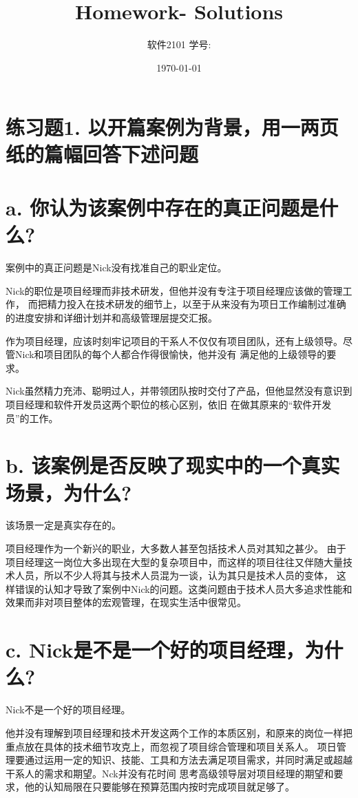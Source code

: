 \documentclass[11pt]{article}  %
\title{\vspace{-4cm}\CourseCodeName \space
        \Session \protect\\  Homework-\textbf{\Homework} Solutions}
\author{软件2101 \Name \space 学号: \SID}
\date{\today}
\begin{document}
\maketitle

\section*{练习题1. 以开篇案例为背景，用一两页纸的篇幅回答下述问题}

\section*{a. 你认为该案例中存在的真正问题是什么? }

案例中的真正问题是Nick没有找准自己的职业定位。

Nick的职位是项目经理而非技术研发，但他并没有专注于项目经理应该做的管理工作，
而把精力投入在技术研发的细节上，以至于从来没有为项日工作编制过准确的进度安排和详细计划并和高级管理层提交汇报。

作为项目经理，应该时刻牢记项目的干系人不仅仅有项目团队，还有上级领导。尽管Nick和项目团队的每个人都合作得很愉快，他并没有
满足他的上级领导的要求。

Nick虽然精力充沛、聪明过人，并带领团队按时交付了产品，但他显然没有意识到项目经理和软件开发员这两个职位的核心区别，依旧
在做其原来的“软件开发员”的工作。

\section*{b. 该案例是否反映了现实中的一个真实场景，为什么? }

该场景一定是真实存在的。

项目经理作为一个新兴的职业，大多数人甚至包括技术人员对其知之甚少。
由于项目经理这一岗位大多出现在大型的复杂项目中，而这样的项目往往又伴随大量技术人员，所以不少人将其与技术人员混为一谈，认为其只是技术人员的变体，
这样错误的认知才导致了案例中Nick的问题。这类问题由于技术人员大多追求性能和效果而非对项目整体的宏观管理，在现实生活中很常见。

\section*{c. Nick是不是一个好的项目经理，为什么? }

Nick不是一个好的项目经理。

他并没有理解到项目经理和技术开发这两个工作的本质区别，和原来的岗位一样把重点放在具体的技术细节攻克上，而忽视了项目综合管理和项目关系人。
项日管理要通过运用一定的知识、技能、工具和方法去满足项目需求，并同时满足或超越干系人的需求和期望。Nck并没有花时间
思考高级领导层对项目经理的期望和要求，他的认知局限在只要能够在预算范围内按时完成项目就足够了。
\end{document}
